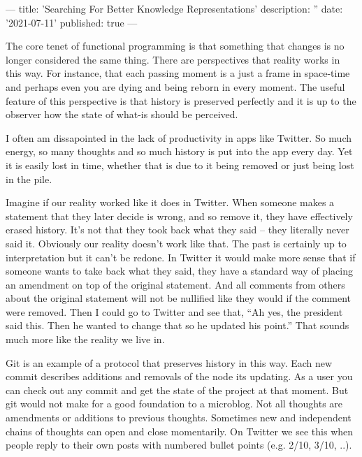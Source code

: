 ---
title: 'Searching For Better Knowledge Representations'
description: ''
date: '2021-07-11'
published: true
---

The core tenet of functional programming is that something that changes is no longer considered the same thing. There are perspectives that reality works in this way. For instance, that each passing moment is a just a frame in space-time and perhaps even you are dying and being reborn in every moment. The useful feature of this perspective is that history is preserved perfectly and it is up to the observer how the state of what-is should be perceived.

I often am dissapointed in the lack of productivity in apps like Twitter. So much energy, so many thoughts and so much history is put into the app every day. Yet it is easily lost in time, whether that is due to it being removed or just being lost in the pile.

Imagine if our reality worked like it does in Twitter. When someone makes a statement that they later decide is wrong, and so remove it, they have effectively erased history. It’s not that they took back what they said – they literally never said it. Obviously our reality doesn’t work like that. The past is certainly up to interpretation but it can’t be redone. In Twitter it would make more sense that if someone wants to take back what they said, they have a standard way of placing an amendment on top of the original statement. And all comments from others about the original statement will not be nullified like they would if the comment were removed. Then I could go to Twitter and see that, “Ah yes, the president said this. Then he wanted to change that so he updated his point.” That sounds much more like the reality we live in.

Git is an example of a protocol that preserves history in this way. Each new commit describes additions and removals of the node its updating. As a user you can check out any commit and get the state of the project at that moment. But git would not make for a good foundation to a microblog. Not all thoughts are amendments or additions to previous thoughts. Sometimes new and independent chains of thoughts can open and close momentarily. On Twitter we see this when people reply to their own posts with numbered bullet points (e.g. 2/10, 3/10, ..).


